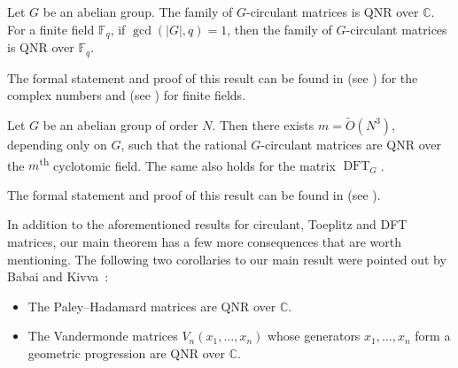 \documentclass{toc}
\newcommand\F{{\mathbb{F}}}
\renewcommand\C{{\mathbb{C}}}
\newcommand{\ts}{\textsuperscript}
\newcommand{\ignore}[1]{}
\DeclareMathOperator{\DFT}{DFT}
\begin{document}
\begin{theorem}\label{allabelian_intro}
Let $G$ be an abelian group.  The family of $G$-circulant matrices is QNR over $\C$.  For a finite field $\F_q$, if $\gcd(|G|,q) = 1$, then the family of $G$-circulant matrices is QNR over $\F_q$.
\end{theorem}

%
The formal statement and proof of this result can be found in  (see ) for the complex numbers and  (see ) for finite fields.
%

%
\begin{theorem}\label{thm:extension_degree_intro}
Let $G$ be an abelian group of order $N$.  Then there exists
$m = \tilde{O}(N^3)$, depending only on $G$, such that the rational
$G$-circulant matrices are QNR over the $m$\ts{th}
cyclotomic field.  The same also holds for the matrix $\DFT_G$.
\end{theorem}
%

%
The formal statement and proof of this result can be found in  (see ).
%

In addition to the aforementioned results for circulant, Toeplitz and
DFT matrices, 
our main theorem has a few more consequences that are worth mentioning.
The following two corollaries to our main result were pointed out 
by Babai and Kivva~\cite{kivva}:
%
\begin{itemize}
\item  The Paley--Hadamard matrices are QNR over $\C$.
\item  The Vandermonde matrices $V_n(x_1, \dots, x_n)$ whose generators
$x_1, \dots, x_n$ form a geometric progression are QNR over $\C$.
\end{itemize}

\ignore{  %
\begin{corollary}
The Paley--Hadamard matrices are QNR over $\C$.
\end{corollary}
%
%
%
%
This result is interesting because the Paley--Hadamard matrices are an exponentially more frequent family of Hadamard matrices than the Walsh--Hadamard matrices. 
\begin{corollary}
Vandermonde matrices $V_n(x_1, \dots, x_n)$ whose generators
$x_1, \dots, x_n$ form a geometric progression are QNR over any
finite field or $\C$.
\end{corollary}

%
%
It has been conjectured that Vandermonde matrices with distinct
generators are rigid.  Our result refutes this conjecture.

%
For the proofs of these two corollaries, see \expref{Section}{sec:kivva}.
}  %
\end{document}
